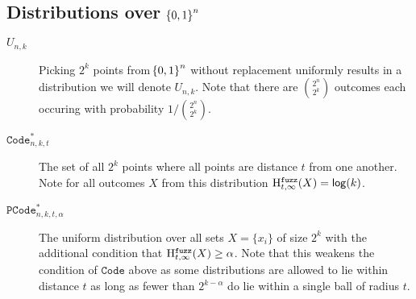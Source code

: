 \subsection{Distributions over $\!\left\{ 0,1 \right\}^{n}$}
\begin{description}
    \item[$U_{n,k}$] Picking $2^k$ points from $\!\left\{ 0,1 \right\}^{n}$ without replacement uniformly results in a distribution we will denote $U_{n,k}$. Note that there are ${2^{n}\choose 2^k}$ outcomes each occuring with probability $1/{2^{n}\choose 2^k}$.

    \item[$\mathtt{Code}_{n,k,t}^{*}$] The set of all $2^k$ points where all points are distance $t$ from one another.  Note for all outcomes $X$ from this distribution $\mathrm{H}^{\mathtt{fuzz}}_{t,\infty}(X) = \mathsf{log}\!\left(k\right)$.
    
    \item[$\mathtt{PCode}_{n, k, t, \alpha}^{*}$] The uniform distribution over all sets $X = \{x_i\}$ of size $2^k$ with the additional condition that $\mathrm{H}^{\mathtt{fuzz}}_{t,\infty}(X) \ge \alpha$.  Note that this weakens the condition of $\mathtt{Code}$ above as some distributions are allowed to lie within distance $t$ as long as fewer than $2^{k-\alpha}$ do lie within a single ball of radius $t$.
\end{description}
 
